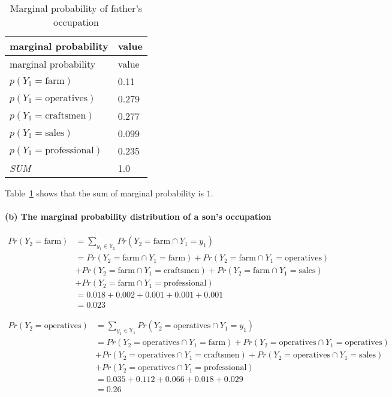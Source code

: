 \documentclass[
  letterpaper,
  DIV=11,
  numbers=noendperiod]{scrreprt}
\let\oldparagraph\paragraph
\renewcommand{\paragraph}[1]{\oldparagraph{#1}\mbox{}}
\begin{document}
\hypertarget{tbl-father}{}
\begin{longtable}[]{@{}ll@{}}
\caption{\label{tbl-father}Marginal probability of father's
occupation}\tabularnewline
\toprule()
marginal probability & value \\
\midrule()
\endfirsthead
\toprule()
marginal probability & value \\
\midrule()
\endhead
\(p(Y_1=\text{farm})\) & 0.11 \\
\(p(Y_1=\text{operatives})\) & 0.279 \\
\(p(Y_1=\text{craftsmen})\) & 0.277 \\
\(p(Y_1=\text{sales})\) & 0.099 \\
\(p(Y_1=\text{professional})\) & 0.235 \\
\emph{SUM} & 1.0 \\
\bottomrule()
\end{longtable}

Table~\ref{tbl-father} shows that the sum of marginal probability is
\(1\).

\hypertarget{b-the-marginal-probability-distribution-of-a-sons-occupation}{%
\paragraph{(b) The marginal probability distribution of a son's
occupation}\label{b-the-marginal-probability-distribution-of-a-sons-occupation}}

\[
\begin{aligned}
    Pr(Y_2 = \text{farm}) &= \sum_{y_1\in\mathbb{Y_1}}Pr(Y_2= \text{farm} \cap Y_1=y_1)\\
    &= Pr(Y_2= \text{farm} \cap Y_1=\text{farm}) + Pr(Y_2= \text{farm} \cap Y_1=\text{operatives}) \\
    & +Pr(Y_2= \text{farm} \cap Y_1=\text{craftsmen}) + Pr(Y_2= \text{farm} \cap Y_1=\text{sales}) \\ 
    & +Pr(Y_2= \text{farm} \cap Y_1=\text{professional})\\
    &= 0.018 + 0.002 + 0.001 + 0.001 + 0.001\\ 
    &= 0.023
\end{aligned}
\]

\[
\begin{aligned}
    Pr(Y_2 = \text{operatives}) &= \sum_{y_1\in\mathbb{Y_1}}Pr(Y_2= \text{operatives} \cap Y_1=y_1)\\
    &= Pr(Y_2= \text{operatives} \cap Y_1=\text{farm}) + Pr(Y_2= \text{operatives} \cap Y_1=\text{operatives}) \\
    & +Pr(Y_2= \text{operatives} \cap Y_1=\text{craftsmen}) + Pr(Y_2= \text{operatives} \cap Y_1=\text{sales}) \\ 
    & +Pr(Y_2= \text{operatives} \cap Y_1=\text{professional})\\
    &= 0.035 + 0.112 + 0.066 + 0.018 + 0.029\\ 
    &= 0.26
\end{aligned}
\]
\end{document}
